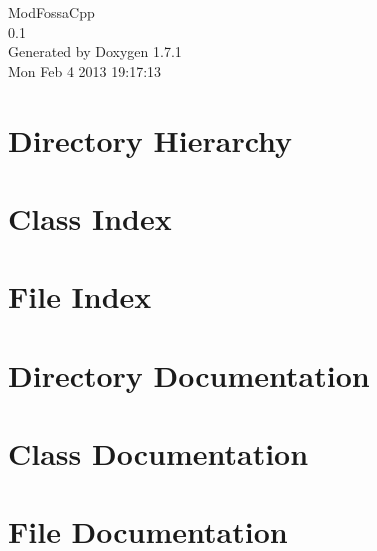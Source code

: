 \documentclass[a4paper]{book}
\begin{document}
\hypersetup{pageanchor=false}
\begin{titlepage}
\vspace*{7cm}
\begin{center}
{\Large ModFossaCpp \\[1ex]\large 0.1 }\\
\vspace*{1cm}
{\large Generated by Doxygen 1.7.1}\\
\vspace*{0.5cm}
{\small Mon Feb 4 2013 19:17:13}\\
\end{center}
\end{titlepage}
\clearemptydoublepage
{}
\tableofcontents
\clearemptydoublepage
{}
\hypersetup{pageanchor=true}
\chapter{Directory Hierarchy}

\chapter{Class Index}

\chapter{File Index}

\chapter{Directory Documentation}


\chapter{Class Documentation}








\chapter{File Documentation}













\printindex
\end{document}
